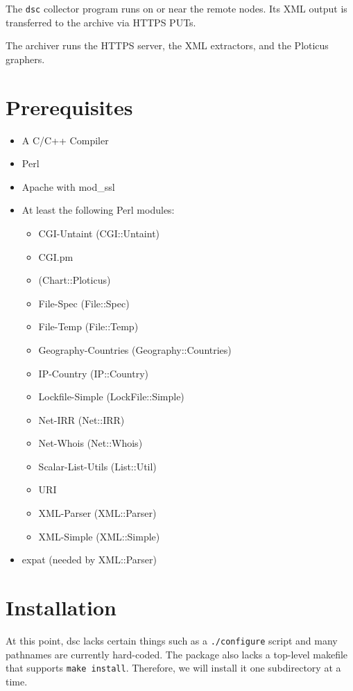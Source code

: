\documentclass{report}
\def\dsc{{\sc dsc}}
\begin{document}
The {\tt dsc\/} collector program runs on or near the remote nodes.
Its XML output is transferred to the archive via HTTPS PUTs.

The archiver runs the HTTPS server, the XML extractors, and the
Ploticus graphers.

\chapter{Prerequisites}

\begin{itemize}
\item
	A C/C++ Compiler
\item
	Perl
\item
	Apache with mod\_ssl
\item
	At least the following Perl modules:
	\begin{itemize}
	\item CGI-Untaint (CGI::Untaint)
	\item CGI.pm
	\item (Chart::Ploticus)
	\item File-Spec (File::Spec)
	\item File-Temp (File::Temp)
	\item Geography-Countries (Geography::Countries)
	\item IP-Country (IP::Country)
	\item Lockfile-Simple (LockFile::Simple)
	\item Net-IRR (Net::IRR)
	\item Net-Whois (Net::Whois)
	\item Scalar-List-Utils (List::Util)
	\item URI
	\item XML-Parser (XML::Parser)
	\item XML-Simple (XML::Simple)
	\end{itemize}
\item
	expat (needed by XML::Parser)
\end{itemize}


\chapter{Installation}

At this point, {\dsc} lacks certain things such as a {\tt ./configure\/}
script and many pathnames are currently hard-coded.  The package
also lacks a top-level makefile that supports {\tt make install\/}.
Therefore, we will install it one subdirectory at a time.
\end{document}
